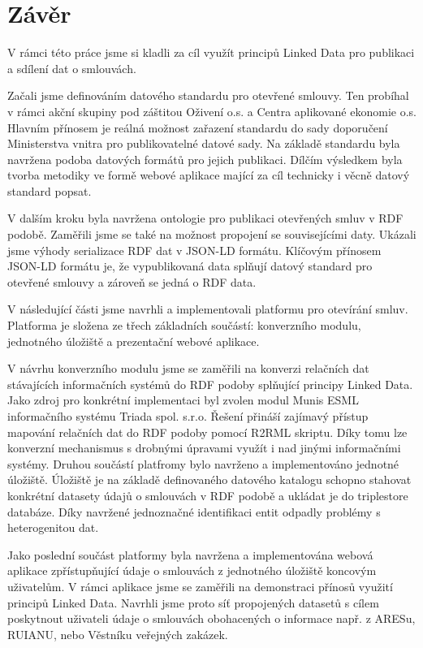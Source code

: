 \chapter*{Závěr}

V rámci této práce jsme si kladli za cíl využít principů Linked Data pro publikaci a sdílení dat o smlouvách. 

Začali jsme definováním datového standardu pro otevřené smlouvy. Ten probíhal v rámci akční skupiny pod záštitou Oživení o.s. a Centra aplikované ekonomie o.s. Hlavním přínosem je reálná možnost zařazení standardu do sady doporučení Ministerstva vnitra pro publikovatelné datové sady. Na základě standardu byla navržena podoba datových formátů pro jejich publikaci. Dílčím výsledkem byla tvorba metodiky ve formě webové aplikace mající za cíl technicky i věcně datový standard popsat. 

V dalším kroku byla navržena ontologie pro publikaci otevřených smluv v RDF podobě. Zaměřili jsme se také na možnost propojení se souvisejícími daty. Ukázali jsme výhody serializace RDF dat v JSON-LD formátu. Klíčovým přínosem JSON-LD formátu je, že vypublikovaná data splňují datový standard pro otevřené smlouvy a zároveň se jedná o RDF data. 

V následující části jsme navrhli a implementovali platformu pro otevírání smluv. Platforma je složena ze třech základních součástí: konverzního modulu, jednotného úložiště a prezentační webové aplikace. 

V návrhu konverzního modulu jsme se zaměřili na konverzi relačních dat stávajících informačních systémů do RDF podoby splňující principy Linked Data. Jako zdroj pro konkrétní implementaci byl zvolen modul Munis ESML informačního systému Triada spol. s.r.o. Řešení přináší zajímavý přístup mapování relačních dat do RDF podoby pomocí R2RML skriptu. Díky tomu lze konverzní mechanismus s drobnými úpravami využít i nad jinými informačními systémy.
Druhou součástí platfromy bylo navrženo a implementováno jednotné úložiště. Úložiště je na základě definovaného datového katalogu schopno stahovat konkrétní datasety údajů o smlouvách v RDF podobě a ukládat je do triplestore databáze. Díky navržené jednoznačné identifikaci entit odpadly problémy s heterogenitou dat. 

Jako poslední součást platformy byla navržena a implementována webová aplikace zpřístupňující údaje o smlouvách z jednotného úložiště koncovým uživatelům. V rámci aplikace jsme se zaměřili na demonstraci přínosů využití principů Linked Data. Navrhli jsme proto síť propojených datasetů s cílem poskytnout uživateli údaje o smlouvách obohacených o informace např. z ARESu, RUIANU, nebo Věstníku veřejných zakázek.

